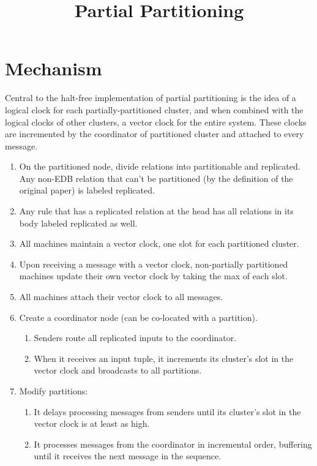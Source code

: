 \documentclass{article}
\title{Partial Partitioning}
\date{}
\author{}
\begin{document}
\maketitle

\section{Mechanism}
Central to the halt-free implementation of partial partitioning is the idea of a logical clock for each partially-partitioned cluster, and when combined with the logical clocks of other clusters, a vector clock for the entire system.
These clocks are incremented by the coordinator of partitioned cluster and attached to every message.

\begin{enumerate}
  \item On the partitioned node, divide relations into partitionable and replicated. Any non-EDB relation that can't be partitioned (by the definition of the original paper) is labeled replicated.
  \item Any rule that has a replicated relation at the head has all relations in its body labeled replicated as well.
  \item All machines maintain a vector clock, one slot for each partitioned cluster.
  \item Upon receiving a message with a vector clock, non-partially partitioned machines update their own vector clock by taking the max of each slot.
  \item All machines attach their vector clock to all messages.
  \item Create a coordinator node (can be co-located with a partition).
    \begin{enumerate}
      \item Senders route all replicated inputs to the coordinator.
      \item When it receives an input tuple, it increments its cluster's slot in the vector clock and broadcasts to all partitions.
    \end{enumerate}
  \item Modify partitions:
    \begin{enumerate}
      \item It delays processing messages from senders until its cluster's slot in the vector clock is at least as high.
      \item It processes messages from the coordinator in incremental order, buffering until it receives the next message in the sequence.
    \end{enumerate}
\end{enumerate}
\end{document}
